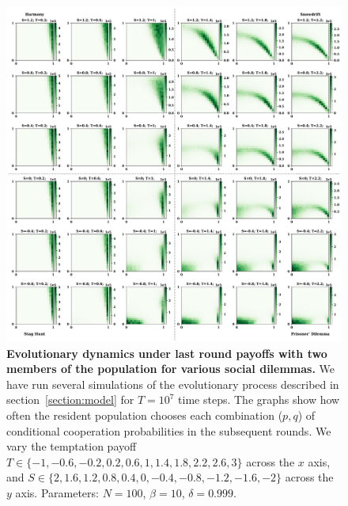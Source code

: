 \documentclass[11pt]{article}
\theoremstyle{plainCl1}
\theoremstyle{plainCl2}
\begin{document}
\begin{figure}[!htbp]
  \centering
  \includegraphics[width=\textwidth]{static/opponents_two_by_two_games.pdf}
  \caption{{\bf Evolutionary dynamics under last round payoffs with two members of the population for various social dilemmas.} 
  We have run several simulations of the evolutionary process described in
  section~\ref{section:model} for $T\!=\!10^7$ time steps. The graphs show how
  often the resident population chooses each combination ($p,q$) of conditional
  cooperation probabilities in the subsequent rounds. We vary the temptation
  payoff \(T \in \{-1, -0.6, -0.2,  0.2, 0.6, 1, 1.4, 1.8, 2.2, 2.6, 3\}\)
  across the \(x\) axis, and  \(S \in \{2, 1.6, 1.2, 0.8, 0.4, 0, -0.4, -0.8,
  -1.2, -1.6, -2\}\) across the \(y\) axis. Parameters: $N\!=\!100$,
  $\beta\!=\!10$, $\delta\!=\!0.999$.}
  \label{fig:last_two_opponents_two_by_two}
\end{figure}
\end{document}
